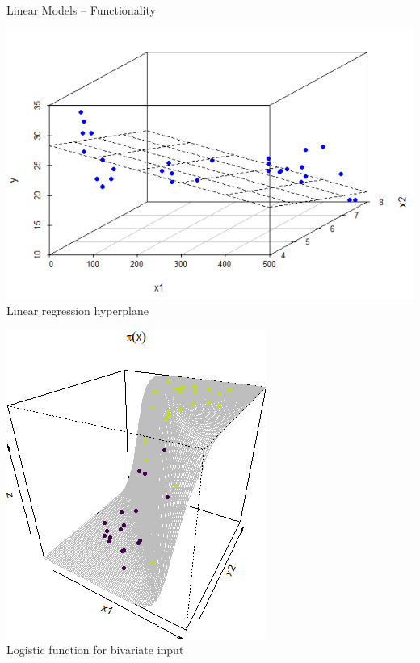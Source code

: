 \begin{vbframe}{Linear Models -- Functionality}
\begin{minipage}[b]{0.32\textwidth}
  \begin{center}
    \includegraphics[height=0.6\textwidth,keepaspectratio=true]{
    figure/linreg-surface.png} \\
    \tiny{Linear regression hyperplane}
  \end{center}
\end{minipage}
\begin{minipage}[b]{0.32\textwidth}
  \begin{center}
    \includegraphics[height=0.6\textwidth, keepaspectratio=true]{
    figure/logreg-2vars-surface.png}\\
    \tiny{Logistic function for bivariate input}
  \end{center}
\end{minipage}
\begin{minipage}[b]{0.32\textwidth}

\end{minipage}
\end{vbframe}
